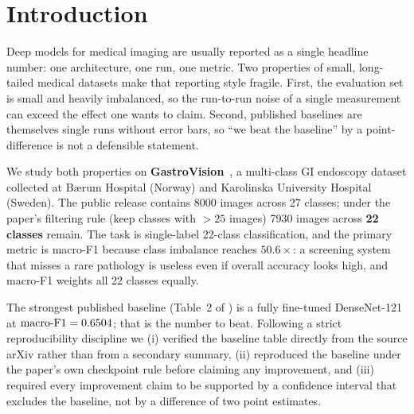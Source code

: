 \documentclass[11pt,a4paper]{article}
\newcommand{\macroF}{\textup{macro-F1}}   %
\begin{document}
\section{Introduction}

Deep models for medical imaging are usually reported as a single headline
number: one architecture, one run, one metric. Two properties of small,
long-tailed medical datasets make that reporting style fragile. First, the
evaluation set is small and heavily imbalanced, so the run-to-run noise of a
single measurement can exceed the effect one wants to claim. Second, published
baselines are themselves single runs without error bars, so ``we beat the
baseline'' by a point-difference is not a defensible statement.

We study both properties on \textbf{GastroVision}~\cite{gastrovision}, a
multi-class GI endoscopy dataset collected at B\ae rum Hospital (Norway) and
Karolinska University Hospital (Sweden). The public release contains
\num{8000} images across 27 classes; under the paper's filtering rule (keep
classes with $>25$ images) \num{7930} images across \textbf{22 classes} remain.
The task is single-label 22-class classification, and the primary metric is
\macroF{} because class imbalance reaches $50.6\times$: a screening system that
misses a rare pathology is useless even if overall accuracy looks high, and
\macroF{} weights all 22 classes equally.

The strongest published baseline (Table~2 of \cite{gastrovision}) is a fully
fine-tuned DenseNet-121 at $\macroF{}=0.6504$; that is the number to beat.
Following a strict reproducibility discipline we (i) verified the baseline table
directly from the source arXiv rather than from a secondary summary, (ii)
reproduced the baseline under the paper's own checkpoint rule before claiming
any improvement, and (iii) required every improvement claim to be supported by a
confidence interval that excludes the baseline, not by a difference of two point
estimates.
\end{document}

